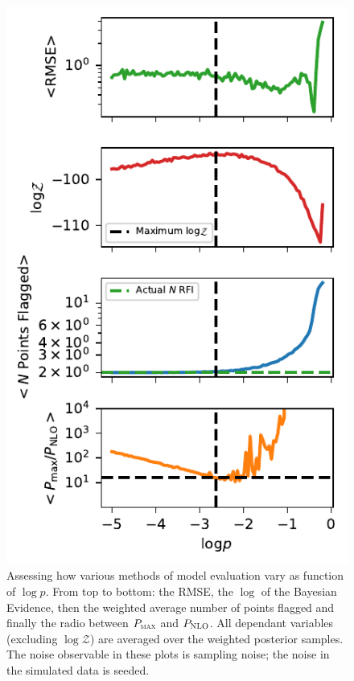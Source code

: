 \documentclass[fleqn,usenatbib]{mnras}
\begin{document}
\begin{figure}
	\includegraphics[width=\columnwidth]{f_approx_current_sig5_2.pdf}
    \caption{Assessing how various methods of model evaluation vary as function of $\log p$. From top to bottom: the RMSE, the $\log$ of the Bayesian Evidence, then the weighted average number of points flagged and finally the radio between $P_{\textsc{max}}$ and $P_{\textsc{NLO}}$. All dependant variables (excluding $\log \mathcal{Z}$) are averaged over the weighted posterior samples. The noise observable in these plots is sampling noise; the noise in the simulated data is seeded.}
    \label{fig:4pane}
\end{figure}
\end{document}
